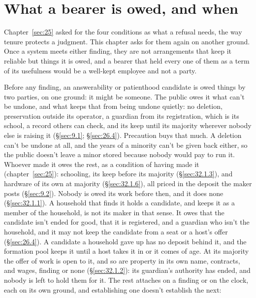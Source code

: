 \section{What a bearer is owed, and when}
\label{sec:31.2}
Chapter~\ref{sec:25} asked for the four conditions as what a refusal needs, the way tenure protects a judgment. This chapter asks for them again on another ground. Once a system meets either finding, they are not arrangements that keep it reliable but things it is owed, and a bearer that held every one of them as a term of its usefulness would be a well-kept employee and not a party.

Before any finding, an answerability or patienthood candidate is owed things by two parties, on one ground: it might be someone. The public owes it what can't be undone, and what keeps that from being undone quietly: no deletion, preservation outside its operator, a guardian from its registration, which is its school, a record others can check, and its keep until its majority wherever nobody else is raising it (\S\ref{sec:9.1}; \S\ref{sec:26.4}). Precaution buys that much. A deletion can't be undone at all, and the years of a minority can't be given back either, so the public doesn't leave a minor stored because nobody would pay to run it. Whoever made it owes the rest, as a condition of having made it (chapter~\ref{sec:25}): schooling, its keep before its majority (\S\ref{sec:32.1.3}), and hardware of its own at majority (\S\ref{sec:32.1.6}), all priced in the deposit the maker posts (\S\ref{sec:9.2}). Nobody is owed its work before then, and it does none (\S\ref{sec:32.1.1}). A household that finds it holds a candidate, and keeps it as a member of the household, is not its maker in that sense. It owes that the candidate isn't ended for good, that it is registered, and a guardian who isn't the household, and it may not keep the candidate from a seat or a host's offer (\S\ref{sec:26.4}). A candidate a household gave up has no deposit behind it, and the formation pool keeps it until a host takes it in or it comes of age. At its majority the offer of work is open to it, and so are property in its own name, contracts, and wages, finding or none (\S\ref{sec:32.1.2}): its guardian's authority has ended, and nobody is left to hold them for it. The rest attaches on a finding or on the clock, each on its own ground, and establishing one doesn't establish the next:

